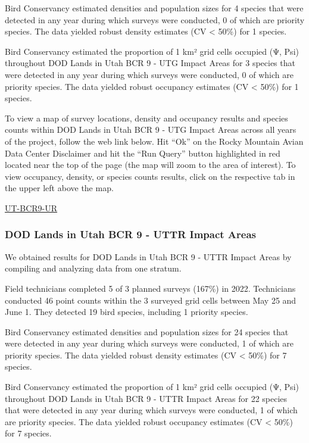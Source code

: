 \documentclass[
  letterpaper,
  DIV=11,
  numbers=noendperiod,
  oneside]{scrreprt}
\begin{document}
Bird Conservancy estimated densities and population sizes for 4 species
that were detected in any year during which surveys were conducted, 0 of
which are priority species. The data yielded robust density estimates
(CV \textless{} 50\%) for 1 species.

Bird Conservancy estimated the proportion of 1 km² grid cells occupied
(Ψ, Psi) throughout DOD Lands in Utah BCR 9 - UTG Impact Areas for 3
species that were detected in any year during which surveys were
conducted, 0 of which are priority species. The data yielded robust
occupancy estimates (CV \textless{} 50\%) for 1 species.

To view a map of survey locations, density and occupancy results and
species counts within DOD Lands in Utah BCR 9 - UTG Impact Areas across
all years of the project, follow the web link below. Hit ``Ok'' on the
Rocky Mountain Avian Data Center Disclaimer and hit the ``Run Query''
button highlighted in red located near the top of the page (the map will
zoom to the area of interest). To view occupancy, density, or species
counts results, click on the respective tab in the upper left above the
map.

\href{http://www.rmbo.org/new_site/adc/QueryWindow.aspx\#N4IgzgLgTghhCuBbEAuABCAqgFQLQCEBhAJQE5dNj0ARAUwAcYoJFaA7CNAewDM06e7MLTS40OAOJoAkokYBjTgEEotGCAC+QA==}{UT-BCR9-UR}

\hypertarget{dod-lands-in-utah-bcr-9---uttr-impact-areas}{%
\subsubsection{DOD Lands in Utah BCR 9 - UTTR Impact
Areas}\label{dod-lands-in-utah-bcr-9---uttr-impact-areas}}

We obtained results for DOD Lands in Utah BCR 9 - UTTR Impact Areas by
compiling and analyzing data from one stratum.

Field technicians completed 5 of 3 planned surveys (167\%) in 2022.
Technicians conducted 46 point counts within the 3 surveyed grid cells
between May 25 and June 1. They detected 19 bird species, including 1
priority species.

Bird Conservancy estimated densities and population sizes for 24 species
that were detected in any year during which surveys were conducted, 1 of
which are priority species. The data yielded robust density estimates
(CV \textless{} 50\%) for 7 species.

Bird Conservancy estimated the proportion of 1 km² grid cells occupied
(Ψ, Psi) throughout DOD Lands in Utah BCR 9 - UTTR Impact Areas for 22
species that were detected in any year during which surveys were
conducted, 1 of which are priority species. The data yielded robust
occupancy estimates (CV \textless{} 50\%) for 7 species.
\end{document}
